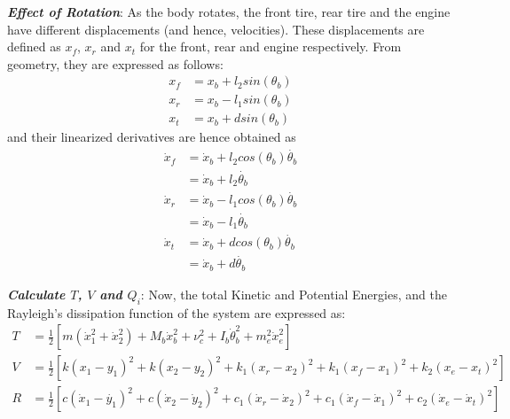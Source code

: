 \documentclass[11pt, oneside]{article}   	%
\begin{document}
\textbf{\textit{Effect of Rotation}}:
\noindent
As the body rotates, the front tire, rear tire and the engine have different displacements (and hence, velocities). These displacements are defined as $x_f$, $x_r$ and $x_t$ for the front, rear and engine respectively. From geometry, they are expressed as follows:
\begin{align}
x_f &= x_b + l_2 sin(\theta_b) \\
x_r &= x_b - l_1 sin(\theta_b) \\
x_t &= x_b + d sin(\theta_b)
\end{align}
\noindent
and their linearized derivatives are hence obtained as
\begin{align}
\dot{x}_f &= \dot{x}_b + l_2 cos(\theta_b) \dot{\theta_b} \\
&= \dot{x}_b + l_2 \dot{\theta_b}\\
\dot{x}_r &= \dot{x}_b - l_1 cos(\theta_b) \dot{\theta_b} \\
&= \dot{x}_b - l_1 \dot{\theta_b}\\
\dot{x}_t &= \dot{x}_b + d cos(\theta_b) \dot{\theta_b}\\
&= \dot{x}_b + d  \dot{\theta_b}
\end{align}

\textbf{\textit{Calculate $T$, $V$ and $Q_i$}}: Now, the total Kinetic and Potential Energies, and the Rayleigh's dissipation function of the system are expressed as:
\begin{align}
 T &= \frac{1}{2} \left[ m (\dot{x}_1^2 + \dot{x}_2^2) + M_b \dot{x}_b^2 + \nu_c^2 + I_b \dot{\theta}_b^2 + m_e^2 \dot{x}_e^2 \right] \\[1pt]
 V &= \frac{1}{2} \left[ k(x_1-y_1)^2 + k(x_2-y_2)^2 + k_1(x_r - x_2)^2 + k_1(x_f - x_1)^2 + k_2(x_e - x_t)^2 \right] \\[1pt]
 R &= \frac{1}{2} \left[ c(\dot{x}_1-\dot{y_1})^2 + c(\dot{x}_2-\dot{y}_2)^2 + c_1(\dot{x}_r - \dot{x}_2)^2 + c_1(\dot{x}_f - \dot{x}_1)^2 + c_2(\dot{x}_e - \dot{x}_t)^2 \right]
\end{align} \\
\end{document}
